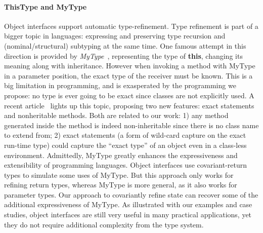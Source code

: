 \paragraph{ThisType and MyType}
Object interfaces support automatic type-refinement.
Type refinement is part of a bigger topic in \classbased languages: expressing and
preserving type recursion and (nominal/structural) subtyping at the same time.
One famous attempt in this direction is provided by
\emph{MyType}~\cite{bruce1994paradigmatic}, representing the type of
\textbf{this}, changing its meaning along with inheritance. However when
invoking a method with MyType in a parameter position, the exact type of the
receiver must be known.  This is a big limitation in \classbased \objectoriented
programming, and is exasperated by the \interfacebased programming we propose: no
type is ever going to be exact since classes are not explicitly used. A recent
article~\cite{Saito2013933} lights up this topic, proposing two
new features: exact statements and nonheritable methods. Both are
related to our work: 1) any method generated inside the \Q@of@ method is indeed
non-inheritable since there is no class name to extend from; 2) exact
statements (a form of wild-card capture on the exact run-time type) could
capture the ``exact type'' of an object even in a class-less
environment.
Admittedly, MyType greatly enhances the expressiveness and extensibility of
\objectoriented programming languages. Object interfaces use covariant-return types to
simulate some uses of MyType. But this approach only works for refining
return types, whereas MyType is more general, as it also works for
parameter types. Our approach to covariantly refine state can recover
some of the additional expressiveness of MyType. As illustrated with our examples and
case studies, object interfaces are still very useful in many
practical applications, yet they do not require additional
complexity from the type system.



